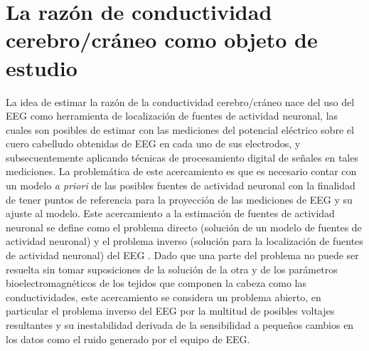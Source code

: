 \section{La razón de conductividad cerebro/cráneo como objeto de estudio}
\label{sec:intro:study}

La idea de estimar la razón de la conductividad cerebro/cráneo nace del uso del EEG como herramienta de localización de fuentes de actividad neuronal, las cuales son posibles de estimar con las mediciones del potencial eléctrico sobre el cuero cabelludo obtenidas de EEG en cada uno de sus electrodos, y subsecuentemente aplicando técnicas de procesamiento digital de señales en tales mediciones. La problemática de este acercamiento es que es necesario contar con un modelo \emph{a priori} de las posibles fuentes de actividad neuronal con la finalidad de tener puntos de referencia para la proyección de las mediciones de EEG y su ajuste al modelo. Este acercamiento a la estimación de fuentes de actividad neuronal se define como el problema directo (solución de un modelo de fuentes de actividad neuronal) y el problema inverso (solución para la localización de fuentes de actividad neuronal) del EEG \cite{Hallez2007}. Dado que una parte del problema no puede ser resuelta sin tomar suposiciones de la solución de la otra y de los parámetros bioelectromagnéticos de los tejidos que componen la cabeza como las conductividades, este acercamiento se considera un problema abierto, en particular el problema inverso del EEG por la multitud de posibles voltajes resultantes y su inestabilidad derivada de la sensibilidad a pequeños cambios en los datos como el ruido generado por el equipo de EEG. 

